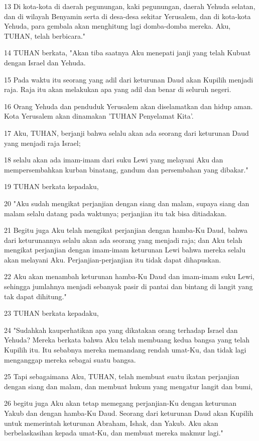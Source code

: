 \par 13 Di kota-kota di daerah pegunungan, kaki pegunungan, daerah Yehuda selatan, dan di wilayah Benyamin serta di desa-desa sekitar Yerusalem, dan di kota-kota Yehuda, para gembala akan menghitung lagi domba-domba mereka. Aku, TUHAN, telah berbicara."
\par 14 TUHAN berkata, "Akan tiba saatnya Aku menepati janji yang telah Kubuat dengan Israel dan Yehuda.
\par 15 Pada waktu itu seorang yang adil dari keturunan Daud akan Kupilih menjadi raja. Raja itu akan melakukan apa yang adil dan benar di seluruh negeri.
\par 16 Orang Yehuda dan penduduk Yerusalem akan diselamatkan dan hidup aman. Kota Yerusalem akan dinamakan 'TUHAN Penyelamat Kita'.
\par 17 Aku, TUHAN, berjanji bahwa selalu akan ada seorang dari keturunan Daud yang menjadi raja Israel;
\par 18 selalu akan ada imam-imam dari suku Lewi yang melayani Aku dan mempersembahkan kurban binatang, gandum dan persembahan yang dibakar."
\par 19 TUHAN berkata kepadaku,
\par 20 "Aku sudah mengikat perjanjian dengan siang dan malam, supaya siang dan malam selalu datang pada waktunya; perjanjian itu tak bisa ditiadakan.
\par 21 Begitu juga Aku telah mengikat perjanjian dengan hamba-Ku Daud, bahwa dari keturunannya selalu akan ada seorang yang menjadi raja; dan Aku telah mengikat perjanjian dengan imam-imam keturunan Lewi bahwa mereka selalu akan melayani Aku. Perjanjian-perjanjian itu tidak dapat dihapuskan.
\par 22 Aku akan menambah keturunan hamba-Ku Daud dan imam-imam suku Lewi, sehingga jumlahnya menjadi sebanyak pasir di pantai dan bintang di langit yang tak dapat dihitung."
\par 23 TUHAN berkata kepadaku,
\par 24 "Sudahkah kauperhatikan apa yang dikatakan orang terhadap Israel dan Yehuda? Mereka berkata bahwa Aku telah membuang kedua bangsa yang telah Kupilih itu. Itu sebabnya mereka memandang rendah umat-Ku, dan tidak lagi menganggap mereka sebagai suatu bangsa.
\par 25 Tapi sebagaimana Aku, TUHAN, telah membuat suatu ikatan perjanjian dengan siang dan malam, dan membuat hukum yang mengatur langit dan bumi,
\par 26 begitu juga Aku akan tetap memegang perjanjian-Ku dengan keturunan Yakub dan dengan hamba-Ku Daud. Seorang dari keturunan Daud akan Kupilih untuk memerintah keturunan Abraham, Ishak, dan Yakub. Aku akan berbelaskasihan kepada umat-Ku, dan membuat mereka makmur lagi."

